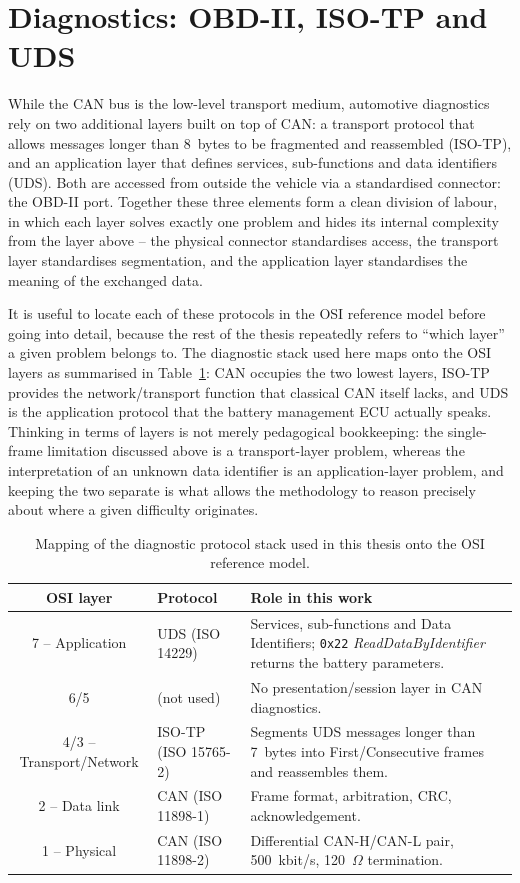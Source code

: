 \documentclass[11pt,a4paper,oneside,parskip=half]{scrreprt}
\providecommand{\hex}{}\renewcommand{\hex}[1]{\texttt{0x#1}}
\begin{document}
\section{Diagnostics: OBD-II, ISO-TP and UDS}
\label{sec:diag}
While the CAN bus is the low-level transport medium, automotive diagnostics rely on two additional layers built on top of CAN: a transport protocol that allows messages longer than 8~bytes to be fragmented and reassembled (ISO-TP), and an application layer that defines services, sub-functions and data identifiers (UDS). Both are accessed from outside the vehicle via a standardised connector: the OBD-II port. Together these three elements form a clean division of labour, in which each layer solves exactly one problem and hides its internal complexity from the layer above -- the physical connector standardises access, the transport layer standardises segmentation, and the application layer standardises the meaning of the exchanged data.

It is useful to locate each of these protocols in the OSI reference model before going into detail, because the rest of the thesis repeatedly refers to ``which layer'' a given problem belongs to. The diagnostic stack used here maps onto the OSI layers as summarised in Table~\ref{tab:osi_stack}: CAN occupies the two lowest layers, ISO-TP provides the network/transport function that classical CAN itself lacks, and UDS is the application protocol that the battery management ECU actually speaks. Thinking in terms of layers is not merely pedagogical bookkeeping: the single-frame limitation discussed above is a transport-layer problem, whereas the interpretation of an unknown data identifier is an application-layer problem, and keeping the two separate is what allows the methodology to reason precisely about where a given difficulty originates.

\begin{table}[H]
\caption{Mapping of the diagnostic protocol stack used in this thesis onto the OSI reference model.}
\label{tab:osi_stack}
\centering
\begin{tabular}{clp{6.6cm}}
\toprule
\textbf{OSI layer} & \textbf{Protocol} & \textbf{Role in this work} \\
\midrule
7 -- Application & UDS (ISO 14229)        & Services, sub-functions and Data Identifiers; \hex{22} \textit{ReadDataByIdentifier} returns the battery parameters. \\
6/5             & (not used)              & No presentation/session layer in CAN diagnostics. \\
4/3 -- Transport/Network & ISO-TP (ISO 15765-2) & Segments UDS messages longer than 7~bytes into First/Consecutive frames and reassembles them. \\
2 -- Data link  & CAN (ISO 11898-1)       & Frame format, arbitration, CRC, acknowledgement. \\
1 -- Physical   & CAN (ISO 11898-2)       & Differential CAN-H/CAN-L pair, 500~kbit/s, 120~$\Omega$ termination. \\
\bottomrule
\end{tabular}
\end{table}
\end{document}
